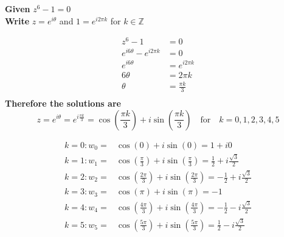 \documentclass[a4paper, 8pt]{extarticle}
\begin{document}
\begin{examplebox}[Determine all solutions to $z^6 -1 = 0$ and factor $x^6-1$ as a product of linear and quadratic factors]
	\label{sol:2023Q1b}
	\textbf{Given} $z^6 -1 = 0$ \\
	\textbf{Write} $z = e^{i \theta}$ and $1 = e^{i 2 \pi k}$ for $k \in \mathbb{Z}$

	\begin{align*}
		z^6 -1                         & = 0               \\
		e^{i 6 \theta} - e^{i 2 \pi k} & = 0               \\
		e^{i 6 \theta}                 & = e^{i 2 \pi k}   \\
		6 \theta                       & = 2 \pi k         \\
		\theta                         & = \frac{\pi k}{3} \\
	\end{align*}
	\textbf{Therefore the solutions are}
	$$z = e^{i \theta} = e^{i \frac{\pi k}{3}} = \cos\left(\frac{\pi k}{3}\right) + i\sin\left(\frac{\pi k}{3}\right) \quad \text{for} \quad k = 0, 1, 2, 3, 4, 5$$

	\begin{minipage}{0.49\textwidth}
		\begin{align*}
			k = 0 : w_0 =  & \cos\left(0\right) + i\sin\left(0\right) = 1 + i0                                                       \\
			k = 1 : w_1 =  & \cos\left(\frac{\pi}{3}\right) + i\sin\left(\frac{\pi}{3}\right)    = \frac{1}{2} + i\frac{\sqrt{3}}{2} \\
			k = 2 : w_2  = & \cos\left(\frac{2\pi}{3}\right) + i\sin\left(\frac{2\pi}{3}\right) = -\frac{1}{2} + i\frac{\sqrt{3}}{2} \\
			k = 3 : w_3 =  & \cos\left(\pi\right) + i\sin\left(\pi\right)                        = -1                                \\
			k = 4 : w_4 =  & \cos\left(\frac{4\pi}{3}\right) + i\sin\left(\frac{4\pi}{3}\right) = -\frac{1}{2} - i\frac{\sqrt{3}}{2} \\
			k = 5 : w_5 =  & \cos\left(\frac{5\pi}{3}\right) + i\sin\left(\frac{5\pi}{3}\right) = \frac{1}{2} - i\frac{\sqrt{3}}{2}  \\
		\end{align*}
	\end{minipage}
	\begin{minipage}{0.5\textwidth}
		\begin{center}
\end{center}
\end{minipage}
\end{examplebox}
\end{document}
